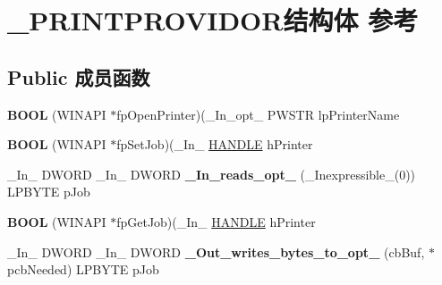 \hypertarget{struct___p_r_i_n_t_p_r_o_v_i_d_o_r}{}\section{\+\_\+\+P\+R\+I\+N\+T\+P\+R\+O\+V\+I\+D\+O\+R结构体 参考}
\label{struct___p_r_i_n_t_p_r_o_v_i_d_o_r}
\subsection*{Public 成员函数}
\begin{DoxyCompactItemize}
\item 
\mbox{\label{struct___p_r_i_n_t_p_r_o_v_i_d_o_r_a1f828621444bd3a0a7d937da7e037264}} 
{\bfseries B\+O\+OL} (W\+I\+N\+A\+PI $\ast$fp\+Open\+Printer)(\+\_\+\+In\+\_\+opt\+\_\+ P\+W\+S\+TR lp\+Printer\+Name
\item 
\mbox{\label{struct___p_r_i_n_t_p_r_o_v_i_d_o_r_a9e1793e70a963d687f67bccf85014ef6}} 
{\bfseries B\+O\+OL} (W\+I\+N\+A\+PI $\ast$fp\+Set\+Job)(\+\_\+\+In\+\_\+ \hyperlink{interfacevoid}{H\+A\+N\+D\+LE} h\+Printer
\item 
\mbox{\label{struct___p_r_i_n_t_p_r_o_v_i_d_o_r_a22309e0223db6fea14c778f495e62ae7}} 
\+\_\+\+In\+\_\+ D\+W\+O\+RD \+\_\+\+In\+\_\+ D\+W\+O\+RD {\bfseries \+\_\+\+In\+\_\+reads\+\_\+opt\+\_\+} (\+\_\+\+Inexpressible\+\_\+(0)) L\+P\+B\+Y\+TE p\+Job
\item 
\mbox{\label{struct___p_r_i_n_t_p_r_o_v_i_d_o_r_a74c5c743052500dcc1bc310305b60ea3}} 
{\bfseries B\+O\+OL} (W\+I\+N\+A\+PI $\ast$fp\+Get\+Job)(\+\_\+\+In\+\_\+ \hyperlink{interfacevoid}{H\+A\+N\+D\+LE} h\+Printer
\item 
\mbox{\label{struct___p_r_i_n_t_p_r_o_v_i_d_o_r_a017b40fd6c651712b78888af32e1d64f}} 
\+\_\+\+In\+\_\+ D\+W\+O\+RD \+\_\+\+In\+\_\+ D\+W\+O\+RD {\bfseries \+\_\+\+Out\+\_\+writes\+\_\+bytes\+\_\+to\+\_\+opt\+\_\+} (cb\+Buf, $\ast$pcb\+Needed) L\+P\+B\+Y\+TE p\+Job
\item 
\mbox{\label{struct___p_r_i_n_t_p_r_o_v_i_d_o_r_aafd64e1d1636f989759249070ac6611c}} 

\end{DoxyCompactItemize}
